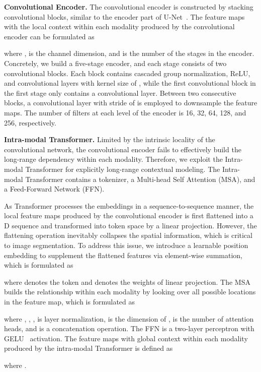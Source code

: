 \documentclass[runningheads]{llncs}
\begin{document}
\noindent\textbf{Convolutional Encoder.}
The convolutional encoder is constructed by stacking convolutional blocks, similar to the encoder part of U-Net~\cite{ronneberger2015u}. The feature maps with the local context within each modality produced by the convolutional encoder  can be formulated as

where ,  is the channel dimension, and  is the number of the stages in the encoder. Concretely, we build a five-stage encoder, and each stage consists of two convolutional blocks. Each block contains cascaded group normalization, ReLU, and convolutional layers with kernel size of , while the first convolutional block in the first stage only contains a convolutional layer. Between two consecutive blocks, a convolutional layer with stride of  is employed to downsample the feature maps. The number of filters at each level of the encoder is 16, 32, 64, 128, and 256, respectively.

\noindent\textbf{Intra-modal Transformer.}
Limited by the intrinsic locality of the convolutional network, the convolutional encoder fails to effectively build the long-range dependency within each modality. Therefore, we exploit the Intra-modal Transformer for explicitly long-range contextual modeling. The Intra-modal Transformer contains a tokenizer, a Multi-head Self Attention (MSA), and a Feed-Forward Network (FFN). 

As Transformer processes the embeddings in a sequence-to-sequence manner, the local feature maps  produced by the convolutional encoder is first flattened into a D sequence and transformed into token space by a linear projection. However, the flattening operation inevitably collapses the spatial information, which is critical to image segmentation. To address this issue, we introduce a learnable position embedding  to supplement the flattened features via element-wise summation, which is formulated as

where  denotes the token and  denotes the weights of linear projection. The MSA builds the relationship within each modality by looking over all possible locations in the feature map, which is formulated as


where , ,  ,  is layer normalization,  is the dimension of ,  is the number of attention heads, and  is a concatenation operation. The FFN is a two-layer perceptron with GELU~\cite{hendrycks2016gaussian} activation. The feature maps with global context within each modality produced by the intra-modal Transformer is defined as

where .
\end{document}
